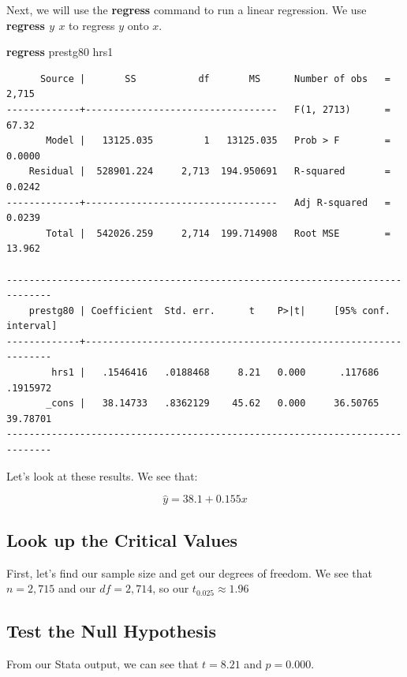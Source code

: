 \documentclass[
]{book}
\newenvironment{Shaded}{\begin{snugshade}}{\end{snugshade}}
\newcommand{\KeywordTok}[1]{\textcolor[rgb]{0.13,0.29,0.53}{\textbf{#1}}}
\newcommand{\NormalTok}[1]{#1}
\begin{document}
Next, we will use the \textbf{regress} command to run a linear regression. We use \textbf{regress \(y\) \(x\)} to regress \(y\) onto \(x\).

\begin{Shaded}
\begin{Highlighting}[]
\KeywordTok{regress}\NormalTok{ prestg80 hrs1}
\end{Highlighting}
\end{Shaded}

\begin{verbatim}
      Source |       SS           df       MS      Number of obs   =     2,715
-------------+----------------------------------   F(1, 2713)      =     67.32
       Model |   13125.035         1   13125.035   Prob > F        =    0.0000
    Residual |  528901.224     2,713  194.950691   R-squared       =    0.0242
-------------+----------------------------------   Adj R-squared   =    0.0239
       Total |  542026.259     2,714  199.714908   Root MSE        =    13.962

------------------------------------------------------------------------------
    prestg80 | Coefficient  Std. err.      t    P>|t|     [95% conf. interval]
-------------+----------------------------------------------------------------
        hrs1 |   .1546416   .0188468     8.21   0.000      .117686    .1915972
       _cons |   38.14733   .8362129    45.62   0.000     36.50765    39.78701
------------------------------------------------------------------------------
\end{verbatim}

Let's look at these results. We see that:

\[ \hat{y} = 38.1 + 0.155x \]

\subsection{Look up the Critical Values}\label{look-up-the-critical-values}

First, let's find our sample size and get our degrees of freedom. We see that \(n=2,715\) and our \(df=2,714\), so our \(t_{0.025} \approx 1.96\)

\subsection{Test the Null Hypothesis}\label{test-the-null-hypothesis}

From our Stata output, we can see that \(t=8.21\) and \(p=0.000\).
\end{document}
